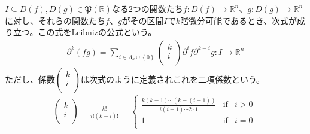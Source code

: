 \documentclass[dvipdfmx]{jsarticle}
\begin{document}
\begin{thm}[Leibnizの公式]\label{4.2.1.6}
$I \subseteq D(f),D(g)\in \mathfrak{P}\left( \mathbb{R} \right)$なる2つの関数たち$f:D(f) \rightarrow \mathbb{R}^{n}$、$g:D(g) \rightarrow \mathbb{R}^{n}$に対し、それらの関数たち$f$、$g$がその区間$I$で$k$階微分可能であるとき、次式が成り立つ。この式をLeibnizの公式という。
\begin{align*}
\partial^{k}(fg) = \sum_{i \in \varLambda_{k} \cup \left\{ 0 \right\}} {\begin{pmatrix}
k \\
i \\
\end{pmatrix}\partial^{i}f\partial^{k - i}g}:I \rightarrow \mathbb{R}^{n}
\end{align*}
ただし、係数$\begin{pmatrix}
k \\
i \\
\end{pmatrix}$は次式のように定義されこれを二項係数という。
\begin{align*}
\begin{pmatrix}
k \\
i \\
\end{pmatrix} = \frac{k!}{i!(k - i)!} = \left\{ \begin{matrix}
\frac{k(k - 1)\cdots\left( k - (i - 1) \right)}{i(i - 1)\cdots 2 \cdot 1} & \mathrm{if} & i > 0 \\
1 & \mathrm{if} & i = 0 \\
\end{matrix} \right.\ 
\end{align*}
\end{thm}
\end{document}
